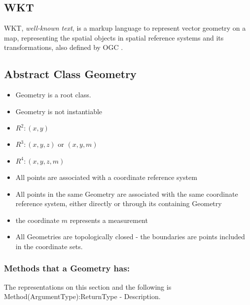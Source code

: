 \documentclass[11pt]{article}
\begin{document}
\subsection{WKT}
WKT, \textit{well-known text}, is a markup language to represent vector geometry on a map, representing the spatial objects in spatial reference systems and its transformations, also defined by OGC \cite{wikipedia_contributors_well-known_2012}. 

\subsection{Abstract Class Geometry}

\begin{itemize}
\item Geometry is a root class.
\item Geometry is not instantiable 
\item $R^{2}: (x,y)$
\item $R^{3}: (x,y,z)$ or $(x,y,m)$
\item $R^{4}: (x,y,z,m)$
\item All points are associated with a coordinate reference system
\item All points in the same Geometry are associated with the same coordinate reference system, either directly or through its containing Geometry
\item the coordinate $m$ represents a measurement
\item All Geometries are topologically closed - the boundaries are points included in the coordinate sets.
\end{itemize}

\subsubsection{Methods that a Geometry has:}
The representations on this section and the following is Method(ArgumentType):ReturnType - Description.
\end{document}
